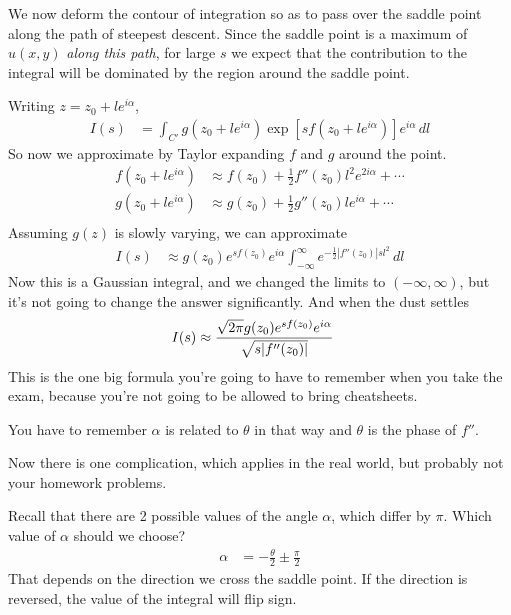 We now deform the contour of integration so as to pass over the saddle point
along the path of steepest descent.
Since the saddle point is a maximum of $u(x, y)$
\emph{along this path},
for large $s$ we expect that the contribution to the integral will be dominated
by the region around the saddle point.

Writing $z = z_0 + l e^{i\alpha}$,
\begin{align}
    I(s) &= \int_{C'}
    g\left( z_0 + l e^{i\alpha} \right)
    \exp\left[
        s f(z_0 + l e^{i\alpha})
    \right]
    e^{i\alpha}\, dl
\end{align}
So now we approximate by Taylor expanding $f$ and $g$ around the point.
\begin{align}
    f\left( z_0 + l e^{i\alpha} \right) &\approx
    f(z_0) + \frac{1}{2}f''\left( z_0 \right) l^2 e^{2i\alpha}
    + \cdots\\
    g\left( z_0 + l e^{i\alpha} \right) &\approx
    g(z_0) + \frac{1}{2}g''\left( z_0 \right) l e^{i\alpha}
    + \cdots\\
\end{align}
Assuming $g(z)$ is slowly varying,
we can approximate
\begin{align}
    I(s) &\approx
    g\left( z_0 \right)
    e^{s f\left(z_0 \right)}
    e^{i\alpha}
    \int_{-\infty}^{\infty}
    e^{-\frac{1}{2}\left|f''\left( z_0 \right)\right| sl^2}
    \,dl
\end{align}
Now this is a Gaussian integral,
and we changed the limits to $(-\infty, \infty)$,
but it's not going to change the answer significantly.
And when the dust settles
\begin{align}
    I(s) &\approx
    \frac{%
        \sqrt{2\pi} g(z_0) e^{sf(z_0)} e^{i\alpha}
    }{%
        \sqrt{s |f''(z_0)|}
    }
\end{align}
This is the one big formula you're going to have to remember when you take the
exam,
because you're not going to be allowed to bring cheatsheets.

You have to remember $\alpha$ is related to $\theta$ in that way
and $\theta$ is the phase of $f''$.

Now there is one complication,
which applies in the real world,
but probably not your homework problems.

Recall that there are 2 possible values of the angle $\alpha$,
which differ by $\pi$.
Which value of $\alpha$ should we choose?
\begin{align}
    \alpha &= -\frac{\theta}{2} \pm \frac{\pi}{2}
\end{align}
That depends on the direction we cross the saddle point.
If the direction is reversed,
the value of the integral will flip sign.

